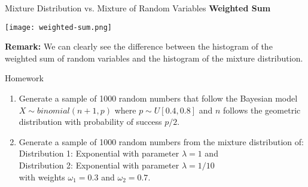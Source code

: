 \documentclass[8pt]{beamer}
\begin{document}
\begin{frame}[fragile]{Mixture Distribution vs. Mixture of Random Variables}
\textbf{Weighted Sum}
\begin{center}
\texttt{[image: weighted-sum.png]}
\end{center}

\vspace{-3mm}

{\bf Remark:} We can clearly see the difference between the histogram of the weighted sum of random variables and the histogram of the mixture distribution.
\end{frame}

\begin{frame}{Homework}
\begin{enumerate}
	\item Generate a sample of 1000 random numbers that follow the Bayesian model $X \sim binomial(n+1,p)$ where $p \sim U[0.4, 0.8]$ and $n$ follows the geometric distribution with probability of success $p/2$.
	\item Generate a sample of 1000 random numbers from the mixture distribution of:\\
Distribution 1: Exponential with parameter $\lambda=1$ and \\
Distribution 2: Exponential with parameter $\lambda=1/10$  \\
with weights $\omega_1=0.3$ and $\omega_2=0.7$. \\
\end{enumerate}
\end{frame}
\end{document}
